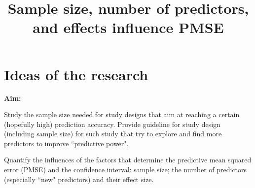 \documentclass[11pt]{article}
\begin{document}
\thispagestyle{fancy}

\title{\bf Sample size, number of predictors, and effects influence PMSE}
\date{}
\maketitle
% 
%
%
%
%
%

\section{Ideas of the research}%

{\bf Aim:}

Study the sample size needed for study designs that aim at reaching a certain (hopefully high) prediction accuracy. Provide guideline for study design (including sample size) for such study that try to explore and find more predictors to improve ``predictive power". 


Quantify the influences of the factors that determine the predictive mean squared error (PMSE) and the confidence interval: sample size; the number of predictors (especially ``new" predictors) and their effect size.

    
    
\end{document}
